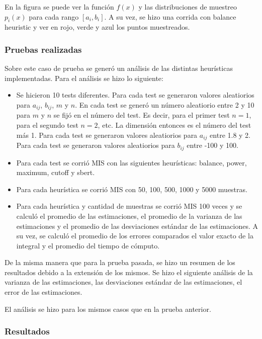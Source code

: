 \documentclass{article}
\begin{document}
En la figura se puede ver la función \( f(x) \) y las distribuciones de muestreo \( p_{i}(x) \) para cada rango \( [a_{i}, b_{i}] \).
A su vez, se hizo una corrida con balance heuristic y ver en rojo, verde y azul los puntos muestreados.

\subsubsection{Pruebas realizadas}

Sobre este caso de prueba se generó un análisis de las distintas heurísticas implementadas.
Para el análisis se hizo lo siguiente:
\begin{itemize}
    \item Se hicieron 10 tests diferentes. Para cada test se generaron valores aleatiorios para \( a_{ij} \), \( b_{ij} \), \( m \) y \( n \).
          En cada test se generó un número aleatiorio entre 2 y 10 para \( m \) y \( n \) se fijó en el número del test.
          Es decir, para el primer test \( n = 1 \), para el segundo test \( n = 2 \), etc. La dimensión entonces es el número del test más 1.
          Para cada test se generaron valores aleatiorios para \( a_{ij} \) entre 1.8 y 2.
          Para cada test se generaron valores aleatiorios para \( b_{ij} \) entre -100 y 100.
    \item Para cada test se corrió MIS con las siguientes heurísticas: balance, power, maximum, cutoff y sbert.
    \item Para cada heurística se corrió MIS con 50, 100, 500, 1000 y 5000 muestras.
    \item Para cada heurística y cantidad de muestras se corrió MIS 100 veces y se calculó el promedio de las estimaciones,
          el promedio de la varianza de las estimaciones y el promedio de las desviaciones estándar de las estimaciones.
          A su vez, se calculó el promedio de los errores comparados el valor exacto de la integral y el promedio del tiempo de cómputo.
\end{itemize}

De la misma manera que para la prueba pasada, se hizo un resumen de los resultados debido a la extensión de los mismos.
Se hizo el siguiente análisis de la varianza de las estimaciones, las desviaciones estándar de las estimaciones, el error de las estimaciones.

El análisis se hizo para los mismos casos que en la prueba anterior.

\subsubsection{Resultados}
\end{document}
